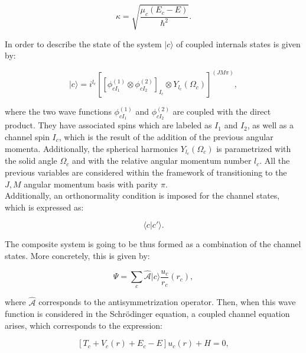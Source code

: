 \documentclass[openany]{book}
\begin{document}
\begin{equation}\label{rmatrix_channels_waveNumber_closed}
	\kappa = \sqrt{\frac{\mu_c(E_c - E)}{\hbar^2}}.
\end{equation}

In order to describe the state of the system $	|c\rangle$ of coupled internals states is given by: 


\begin{equation}\label{rmatrix_channels_state}
	|c\rangle = i^{l_c} [[\phi^{(1)}_{cI_1} \otimes  \phi^{(2)}_{cI_2}]_{I_c} \otimes Y_{l_c}(\Omega_c) ]^{(JM\pi)},
\end{equation}

where the two wave functions $\phi^{(1)}_{cI_1}$ and $\phi^{(2)}_{cI_2}$ are coupled with the direct product. They have associated spins which are labeled as $I_1$ and $I_2$, as well as a channel spin $I_c$, which is the result of the addition of the previous angular momenta. Additionally, the spherical harmonics $Y_{l_c}(\Omega_c)$ is parametrized with the solid angle $\Omega_c$ and with the relative angular momentum number $l_c$. All the previous variables are considered within the framework of transitioning to the $J, M$ angular momentum basis with parity $\pi$. \\

Additionally, an orthonormality condition is imposed for the channel states, which is expressed as: 

\begin{equation}\label{rmatrix_channels_orthonormality}
	\langle c| c' \rangle.
\end{equation}

The composite system is going to be thus formed as a combination of the channel states. More concretely, this is given by: 

\begin{equation}\label{rmatrix_channels_systemState}
	\Psi = \sum_{c} \hat {\mathcal{A}} |c \rangle \frac{u_c}{r_c}(r_c),
\end{equation}

where $\hat{\mathcal{A}}$ corresponds to the antisymmetrization operator. Then, when this wave function is considered in the Schrödinger equation, a coupled channel equation arises, which corresponds to the expression:

\begin{equation}\label{rmatrix_channels_coupledEquation}
	[T_c + V_c(r) + E_c - E]u_c(r) + H =0,
\end{equation}
\end{document}
